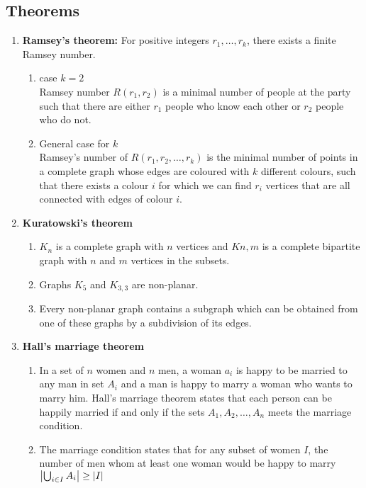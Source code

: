 \documentclass{article}
\begin{document}
\subsection*{Theorems}
	\begin{enumerate}
		\item \textbf{Ramsey's theorem: } For positive integers $r_1,\dots,r_k$, there exists a finite Ramsey number. 
		\begin{enumerate}
		 	\item case $k=2$ \\
		 	Ramsey number $R(r_1,r_2)$ is a minimal number of people at the party such that there are either $r_1$ people who know each other or $r_2$ people who do not.
		 	\item General case for $k$ \\
		 	Ramsey's number of $R(r_1,r_2,\dots,r_k)$ is the minimal number of points in a complete graph whose edges are coloured with $k$ different colours, such that there exists a colour $i$ for which we can find $r_i$ vertices that are all connected with edges of colour $i$.
		\end{enumerate}
		
		\item \textbf{Kuratowski's theorem} %
		\begin{enumerate}
			\item $K_n$ is a complete graph with $n$ vertices and $K{n,m}$ is a complete bipartite graph with $n$ and $m$ vertices in the subsets.
			\item Graphs $K_5$ and $K_{3,3}$ are non-planar.
			\item Every non-planar graph contains a subgraph which can be obtained from one of these graphs by a subdivision of its edges.
		
		\end{enumerate}
		\item \textbf{Hall's marriage theorem} %
		\begin{enumerate}
			\item In a set of $n$ women and $n$ men, a woman $a_i$ is happy to be married to any man in set $A_i$ and a man is happy to marry a woman who wants to marry him. Hall's marriage theorem states that each person can be happily married if and only if the sets $A_1,A_2,\dots,A_n$ meets the marriage condition.
			\item The marriage condition states that for any subset of women $I$, the number of men whom at least one woman would be happy to marry $\abs{\bigcup_{i \in I}A_i} \geq \abs{I}$
		\end{enumerate}
	\end{enumerate}
\end{document}
